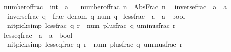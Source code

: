 \begin{isabellebody}
\isanewline
{}\isamarkupfalse%
\ number{\isacharunderscore}{\kern0pt}of{\isacharunderscore}{\kern0pt}frac\ {\isacharcolon}{\kern0pt}{\isacharcolon}{\kern0pt}\ {\isachardoublequoteopen}int\ {\isasymRightarrow}\ {\isacharprime}{\kern0pt}a{\isachardoublequoteclose}\ \isanewline
\ \ {\isachardoublequoteopen}number{\isacharunderscore}{\kern0pt}of{\isacharunderscore}{\kern0pt}frac\ n\ {\isasymequiv}\ Abs{\isacharunderscore}{\kern0pt}Frac\ {\isacharparenleft}{\kern0pt}n{\isacharcomma}{\kern0pt}\ {}{\isacharparenright}{\kern0pt}{\isachardoublequoteclose}\isanewline
\isanewline
{}\isamarkupfalse%
\ inverse{\isacharunderscore}{\kern0pt}frac\ {\isacharcolon}{\kern0pt}{\isacharcolon}{\kern0pt}\ {\isachardoublequoteopen}{\isacharprime}{\kern0pt}a\ {\isasymRightarrow}\ {\isacharprime}{\kern0pt}a{\isachardoublequoteclose}\ \isanewline
\ \ {\isachardoublequoteopen}inverse{\isacharunderscore}{\kern0pt}frac\ q\ {\isasymequiv}\ frac\ {\isacharparenleft}{\kern0pt}denom\ q{\isacharparenright}{\kern0pt}\ {\isacharparenleft}{\kern0pt}num\ q{\isacharparenright}{\kern0pt}{\isachardoublequoteclose}\isanewline
\isanewline
{}\isamarkupfalse%
\ less{\isacharunderscore}{\kern0pt}frac\ {\isacharcolon}{\kern0pt}{\isacharcolon}{\kern0pt}\ {\isachardoublequoteopen}{\isacharprime}{\kern0pt}a\ {\isasymRightarrow}\ {\isacharprime}{\kern0pt}a\ {\isasymRightarrow}\ bool{\isachardoublequoteclose}\ \isanewline
\ \ {\isacharbrackleft}{\kern0pt}nitpick{\isacharunderscore}{\kern0pt}simp{\isacharbrackright}{\kern0pt}{\isacharcolon}{\kern0pt}\ {\isachardoublequoteopen}less{\isacharunderscore}{\kern0pt}frac\ q\ r\ {\isasymlongleftrightarrow}\ num\ {\isacharparenleft}{\kern0pt}plus{\isacharunderscore}{\kern0pt}frac\ q\ {\isacharparenleft}{\kern0pt}uminus{\isacharunderscore}{\kern0pt}frac\ r{\isacharparenright}{\kern0pt}{\isacharparenright}{\kern0pt}\ {\isacharless}{\kern0pt}\ {}{\isachardoublequoteclose}\isanewline
\isanewline
{}\isamarkupfalse%
\ less{\isacharunderscore}{\kern0pt}eq{\isacharunderscore}{\kern0pt}frac\ {\isacharcolon}{\kern0pt}{\isacharcolon}{\kern0pt}\ {\isachardoublequoteopen}{\isacharprime}{\kern0pt}a\ {\isasymRightarrow}\ {\isacharprime}{\kern0pt}a\ {\isasymRightarrow}\ bool{\isachardoublequoteclose}\ \isanewline
\ \ {\isacharbrackleft}{\kern0pt}nitpick{\isacharunderscore}{\kern0pt}simp{\isacharbrackright}{\kern0pt}{\isacharcolon}{\kern0pt}\ {\isachardoublequoteopen}less{\isacharunderscore}{\kern0pt}eq{\isacharunderscore}{\kern0pt}frac\ q\ r\ {\isasymlongleftrightarrow}\ num\ {\isacharparenleft}{\kern0pt}plus{\isacharunderscore}{\kern0pt}frac\ q\ {\isacharparenleft}{\kern0pt}uminus{\isacharunderscore}{\kern0pt}frac\ r{\isacharparenright}{\kern0pt}{\isacharparenright}{\kern0pt}\ {\isasymle}\ {}{\isachardoublequoteclose}\isanewline

\end{isabellebody}
